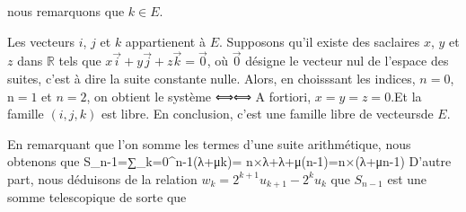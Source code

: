 \stopformula
nous remarquons que $k∈E$.
\stopitemize%
\item%
Les vecteurs $i$, $j$ et $k$ appartienent à $E$. Supposons qu'il existe des saclaires $x$, $y$ et $z$ dans $ℝ$ tels que $x\vec i+y\vec j+z\vec k=\vec0$, où $\vec 0$ désigne le vecteur nul de l'espace des suites, c'est à dire la suite constante nulle.
Alors, en choisssant les indices, $n=0$, n$=1$ et $n=2$, on obtient le système
\startformula
{}⟺⟺
\stopformula
A fortiori, $x=y=z=0$.Et la famille $(i,j,k)$ est libre. En conclusion, c'est une famille libre de vecteursde $E$.
\stopList%
\item%
\startList%
\item En remarquant que l'on somme les termes d'une suite arithmétique, nous obtenons que 
\startformula
S_{n-1}=∑_{k=0}^{n-1}(λ+μk)= n×{λ+λ+μ(n-1)}=n×\Q(λ+μ{n-1}\W)
\stopformula
D'autre part, nous déduisons de la relation $w_k=2^{k+1}u_{k+1}-2^ku_k$ que $S_{n-1}$ est une somme telescopique de sorte que 
\startformula

